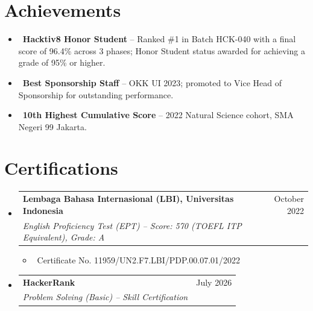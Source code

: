 \documentclass[letterpaper,10pt]{article}
\makeatletter
\newcommand{\resumeItem}[1]{\item\small{#1}}
\newcommand{\resumeSubheading}[4]{
\vspace{-1pt}\item
  \begin{tabular*}{0.97\textwidth}[t]{l@{\extracolsep{\fill}}r}
    \textbf{#1} & #2 \\
    \textit{#3} & \textit{#4} \\
  \end{tabular*}\vspace{-7pt}
}
\newcommand{\resumeSubHeadingList}{\begin{itemize}[leftmargin=0.15in, label={}]}
\newcommand{\resumeSubHeadingListEnd}{\end{itemize}}
\makeatother
\begin{document}
\section{Achievements}
\resumeSubHeadingList
  \resumeItem{\textbullet\ \textbf{Hacktiv8 Honor Student} -- Ranked \#1 in Batch HCK-040 with a final score of 96.4\% across 3 phases; Honor Student status awarded for achieving a grade of 95\% or higher.}
  \resumeItem{\textbullet\ \textbf{Best Sponsorship Staff} -- OKK UI 2023; promoted to Vice Head of Sponsorship for outstanding performance.}
  \resumeItem{\textbullet\ \textbf{10th Highest Cumulative Score} -- 2022 Natural Science cohort, SMA Negeri 99 Jakarta.}
\resumeSubHeadingListEnd

\section{Certifications}
\resumeSubHeadingList
  \resumeSubheading
      {Lembaga Bahasa Internasional (LBI), Universitas Indonesia}{October 2022}
      {English Proficiency Test (EPT) -- Score: 570 (TOEFL ITP Equivalent), Grade: A}{}
      \resumeSubHeadingList
          \resumeItem{\textbullet\ Certificate No. 11959/UN2.F7.LBI/PDP.00.07.01/2022}
      \resumeSubHeadingListEnd
  \resumeSubheading
      {HackerRank}{July 2026}
      {Problem Solving (Basic) -- Skill Certification}{}
\resumeSubHeadingListEnd
\end{document}
